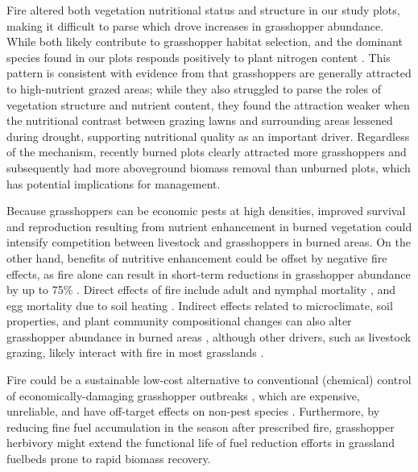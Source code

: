\documentclass[referee, 
	            sn-basic]
           {sn-jnl}
\begin{document}
Fire altered both vegetation nutritional status and structure in our study plots, making it difficult to parse which drove increases in grasshopper abundance. 
While both likely contribute to grasshopper habitat selection, and the dominant species found in our plots responds positively to plant nitrogen content \citep{branson2003}.
This pattern is consistent with evidence from \citet {ozment2021} that grasshoppers are generally attracted to high-nutrient grazed areas; while they also struggled to parse the roles of vegetation structure and nutrient content, they found the attraction weaker when the nutritional contrast between grazing lawns and surrounding areas lessened during drought, supporting nutritional quality as an important driver. 
Regardless of the mechanism, recently burned plots clearly attracted more grasshoppers and subsequently had more aboveground biomass removal than unburned plots, which has potential implications for management. 

Because grasshoppers can be economic pests at high densities, improved survival and reproduction resulting from nutrient enhancement in burned vegetation \citep{branson2003} could intensify competition between livestock and grasshoppers in burned areas. 
On the other hand, benefits of nutritive enhancement could be offset by negative fire effects, as fire alone can result in short-term reductions in grasshopper abundance by up to 75\% \citep{branson2016}. 
Direct effects of fire include adult and nymphal mortality \citep{bock1991}, and egg mortality due to soil heating \citep{branson2013, branson2016, vermeire2004}. 
Indirect effects related to microclimate, soil properties, and plant community compositional changes can also alter grasshopper abundance in burned areas \citep{vanwingerden1991,schirmel2011, evans1983,matenaar2014, meyer2002}, although other drivers, such as livestock grazing, likely interact with fire in most grasslands \citep{mcgranahan2021,fuhlendorf2009,joern2005}. 

Fire could be a sustainable low-cost alternative to conventional (chemical) control of economically-damaging grasshopper outbreaks \citep{branson2006}, which are expensive, unreliable, and have off-target effects on non-pest species \citep{joern2000}. 
Furthermore, by reducing fine fuel accumulation in the season after prescribed fire, grasshopper herbivory might extend the functional life of fuel reduction efforts in grassland fuelbeds prone to rapid biomass recovery. 

\backmatter
\end{document}
